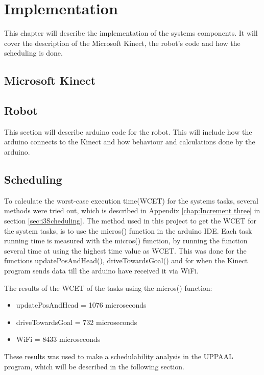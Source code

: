 \chapter{Implementation}
\label{chap:Implementation}
This chapter will describe the implementation of the systems components. It will cover the description of the Microsoft Kinect, the robot's code and how the scheduling is done. 

\section{Microsoft Kinect}
\label{sec:Microsoft Kinect Implementation}

\section{Robot}
\label{sec:Robot}
This section will describe arduino code for the robot. This will include how the arduino connects to the Kinect and how behaviour and calculations done by the arduino. 

\section{Scheduling}
\label{sec:Scheduling implementation}
To calculate the worst-case execution time(WCET) for the systems tasks, several methods were tried out, which is described in Appendix \ref{chap:Increment three} in section \ref{sec:i3Scheduling}. 
The method used in this project to get the WCET for the system tasks, is to use the micros() function in the arduino IDE. \newline
Each task running time is measured with the micros() function, by running the function several time at using the highest time value as WCET. This was done for the functions updatePosAndHead(), driveTowardsGoal() and for when the Kinect program sends data till the arduino have received it via WiFi.

The results of the WCET of the tasks using the micros() function:
\begin{itemize}
	\item updatePosAndHead = 1076 microseconds
	\item driveTowardsGoal = 732 microseconds
	\item WiFi = 8433 microseconds
\end{itemize}
These results was used to make a schedulability analysis in the UPPAAL program, which will be described in the following section.
